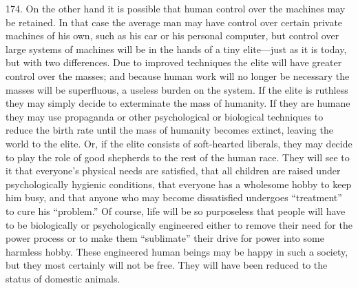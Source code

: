 \documentclass{article}
\begin{document}
174.  On the other hand it is possible that human control over the machines may be retained.  In 
that case the average man may have control over certain private machines of his own, such as his 
car or his personal computer, but control over large systems of machines will be in the hands of a 
tiny elite—just as it is today, but with two differences.  Due to improved techniques the elite will 
have  greater control over the masses; and because human work will no longer be necessary  the 
masses will be superfluous, a useless burden on the system.  If the elite is ruthless they may simply 
decide to exterminate the mass of humanity.  If they are humane they may use propaganda or other 
psychological or biological techniques to reduce the birth rate until the mass of humanity becomes 
extinct, leaving the world to the elite.  Or, if the elite consists of soft-hearted liberals, they may 
decide to play the role of good shepherds to the rest of the human race.  They will see to it that 
everyone’s physical needs are satisfied, that all children are raised under psychologically hygienic 
conditions,  that  everyone  has  a  wholesome  hobby  to  keep  him  busy,  and  that  anyone  who  may  
become  dissatisfied  undergoes  “treatment”  to  cure  his  “problem.”  Of  course,  life  will  be  so  
purposeless that people will have to be biologically or psychologically engineered either to remove 
their  need  for  the  power  process  or  to  make  them  “sublimate”  their  drive  for  power  into  some  
harmless hobby.  These engineered human beings may be happy in such a society, but they most 
certainly will not be free.  They will have been reduced to the status of domestic animals. \vspace{\baselineskip}
\end{document}
